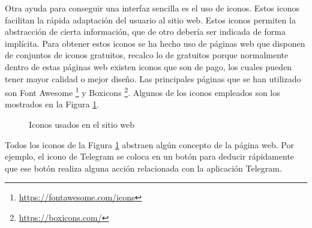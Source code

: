Otra ayuda para conseguir una interfaz sencilla es el uso de iconos. Estos iconos facilitan la rápida adaptación del usuario al sitio web. Estos iconos permiten la abstracción de cierta información, que de otro debería ser indicada de forma implícita. Para obtener estos iconos se ha hecho uso de páginas web que disponen de conjuntos de iconos gratuitos, recalco lo de gratuitos porque normalmente dentro de estas páginas web existen iconos que son de pago, los cuales pueden tener mayor calidad o mejor diseño. Las principales páginas que se han utilizado son Font Awesome \footnote{\url{https://fontawesome.com/icons}} y Boxicons \footnote{\url{https://boxicons.com/}}. Algunos de los iconos empleados son los mostrados en la Figura \ref{fig:iconos_vista}.

\begin{figure}
\centering
{}
\caption{Iconos usados en el sitio web}
\label{fig:iconos_vista}
\end{figure}

Todos los iconos de la Figura \ref{fig:iconos_vista} abstraen algún concepto de la página web. Por ejemplo, el icono de Telegram se coloca en un botón para deducir rápidamente que ese botón realiza alguna acción relacionada con la aplicación Telegram.

